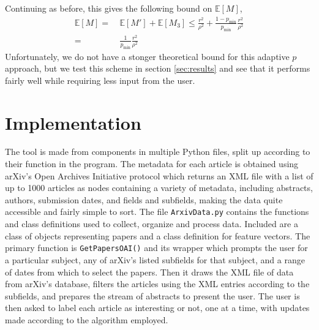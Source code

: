 \documentclass[12pt]{article}
\newcommand{\E}[0]{\mathbb{E}}
\begin{document}
Continuing as before, this gives the following bound on $\E[M]$,
\begin{align*}
\E[M] = &\ \E[M'] + \E[M_3] \leq \frac{r^2}{\rho^2} + \frac{1-p_{\min}}{p_{\min}} \frac{r^2}{\rho^2}\\
= &\ \frac{1}{p_{\min}}\frac{r^2}{\rho^2}
\end{align*}
Unfortunately, we do not have a stonger theoretical bound for this adaptive $p$ approach, but we test this scheme in section \ref{sec:results} and see that it performs fairly well while requiring less input from the user.  

\section{Implementation}
The tool is made from components in multiple Python files, split up according to their function in the program.
The metadata for each article is obtained using arXiv's Open Archives Initiative protocol which returns an XML file with a list of up to 1000 articles as nodes containing a variety of metadata, including abstracts, authors, submission dates, and fields and subfields, making the data quite accessible and fairly simple to sort.
The file {\tt ArxivData.py} contains the functions and class definitions used to collect, organize and process data. Included are a class of objects representing papers and a class definition for feature vectors.
%
%
The primary function is {\tt GetPapersOAI()} and its wrapper which prompts the user for a particular subject, any of arXiv's listed subfields for that subject, and a range of dates from which to select the papers.
Then it draws the XML file of data from arXiv's database, filters the articles using the XML entries according to the subfields, and prepares the stream of abstracts to present the user.
The user is then asked to label each article as interesting or not, one at a time, with updates made according to the algorithm employed.



\end{document}
